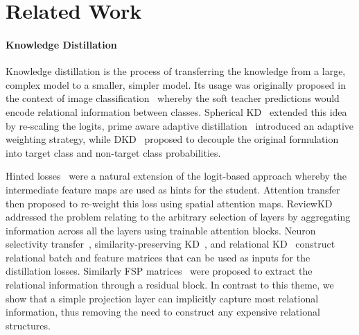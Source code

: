 \documentclass[letterpaper]{article} \usepackage[submission]{aaai23}  \usepackage{times}  \usepackage{helvet}  \usepackage{courier}  \usepackage[hyphens]{url}  \usepackage{graphicx} \urlstyle{rm} \def\UrlFont{\rm}  \usepackage{natbib}  \usepackage{caption} \frenchspacing  \setlength{\pdfpagewidth}{8.5in} \setlength{\pdfpageheight}{11in} \usepackage{algorithm}
\begin{document}
\section{Related Work}
\label{sec:related_work}

\paragraph{Knowledge Distillation}
Knowledge distillation is the process of transferring the knowledge from a large, complex model to a smaller, simpler model. Its usage was originally proposed in the context of image classification~\cite{Hinton2015DistillingNetwork} whereby the soft teacher predictions would encode relational information between classes. Spherical KD~\cite{Guo2020ReducingDistillation} extended this idea by re-scaling the logits, prime aware adaptive distillation~\cite{Zhang2020Prime-AwareDistillation} introduced an adaptive weighting strategy, while DKD~\cite{Zhao2022DecoupledDistillation} proposed to decouple the original formulation into target class and non-target class probabilities.

Hinted losses~\cite{Romero2015FitNets:Nets} were a natural extension of the logit-based approach whereby the intermediate feature maps are used as hints for the student. Attention transfer~\cite{Zagoruyko2019PayingTransfer} then proposed to re-weight this loss using spatial attention maps. ReviewKD~\cite{Chen2021DistillingReview} addressed the problem relating to the arbitrary selection of layers by aggregating information across all the layers using trainable attention blocks. Neuron selectivity transfer~\cite{Huang2017LikeTransfer}, similarity-preserving
KD~\cite{Tung2019Similarity-preservingDistillation}, and relational KD~\cite{Park2019RelationalDistillation} construct relational batch and feature matrices that can be used as inputs for the distillation losses. Similarly FSP matrices~\cite{Yim2017ALearning} were proposed to extract the relational information through a residual block. In contrast to this theme, we show that a simple projection layer can implicitly capture most relational information, thus removing the need to construct any expensive relational structures.
\end{document}
